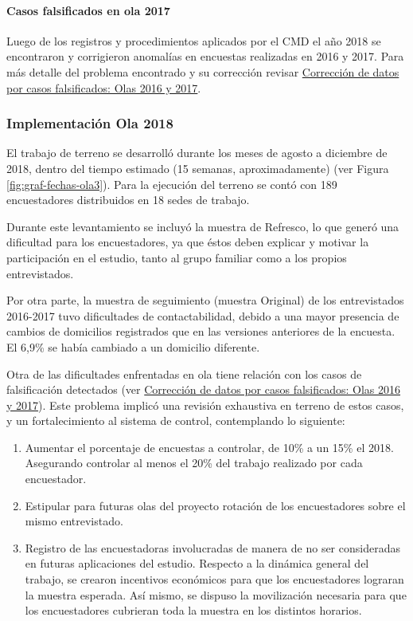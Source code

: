 \documentclass[
  12pt,
]{article}
\begin{document}
\hypertarget{casos-falsificados-en-ola-2017}{%
\paragraph{Casos falsificados en ola 2017}\label{casos-falsificados-en-ola-2017}}

Luego de los registros y procedimientos aplicados por el CMD el año 2018 se encontraron y corrigieron anomalías en encuestas realizadas en 2016 y 2017. Para más detalle del problema encontrado y su corrección revisar \protect\hyperlink{casos-falsificados}{Corrección de datos por casos falsificados: Olas 2016 y 2017}.

\hypertarget{implementaciuxf3n-ola-2018}{%
\subsubsection{Implementación Ola 2018}\label{implementaciuxf3n-ola-2018}}

El trabajo de terreno se desarrolló durante los meses de agosto a diciembre de 2018, dentro del tiempo estimado (15 semanas, aproximadamente) (ver Figura \ref{fig:graf-fechas-ola3}). Para la ejecución del terreno se contó con 189 encuestadores distribuidos en 18 sedes de trabajo.

Durante este levantamiento se incluyó la muestra de Refresco, lo que generó una dificultad para los encuestadores, ya que éstos deben explicar y motivar la participación en el estudio, tanto al grupo familiar como a los propios entrevistados.

Por otra parte, la muestra de seguimiento (muestra Original) de los entrevistados 2016-2017 tuvo dificultades de contactabilidad, debido a una mayor presencia de cambios de domicilios registrados que en las versiones anteriores de la encuesta. El 6,9\% se había cambiado a un domicilio diferente.

Otra de las dificultades enfrentadas en ola tiene relación con los casos de falsificación detectados (ver \protect\hyperlink{casos-falsificados}{Corrección de datos por casos falsificados: Olas 2016 y 2017}). Este problema implicó una revisión exhaustiva en terreno de estos casos, y un fortalecimiento al sistema de control, contemplando lo siguiente:

\begin{enumerate}
\def\labelenumi{\arabic{enumi}.}
\item
  Aumentar el porcentaje de encuestas a controlar, de 10\% a un 15\% el 2018. Asegurando controlar al menos el 20\% del trabajo realizado por cada encuestador.
\item
  Estipular para futuras olas del proyecto rotación de los encuestadores sobre el mismo entrevistado.
\item
  Registro de las encuestadoras involucradas de manera de no ser consideradas en futuras
  aplicaciones del estudio. Respecto a la dinámica general del trabajo, se crearon incentivos económicos para que los encuestadores lograran la muestra esperada. Así mismo, se dispuso la movilización necesaria para que los encuestadores cubrieran toda la muestra en los distintos horarios.
\end{enumerate}
\end{document}
